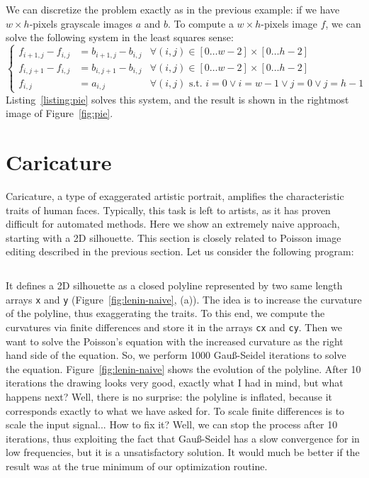 \documentclass[notitlepage,oneside]{book}
\begin{document}
We can discretize the problem exactly as in the previous example: if we have $w \times h$-pixels grayscale images $a$ and $b$.
To compute a $w \times h$-pixels image $f$, we can solve the following system in the least squares sense:
\begin{equation}
\label{eq:pie}
\left \{ \begin{array}{rll}
f_{i+1, j}-f_{i,j} & = b_{i+1, j}-b_{i,j} & \forall (i,j) \in [0 \dots w-2] \times [0\dots h-2]\\
f_{i, j+1}-f_{i,j} & = b_{i, j+1}-b_{i,j} & \forall (i,j) \in [0 \dots w-2] \times [0\dots h-2]\\
f_{i,j}            & = a_{i,j}            & \forall (i,j) \text{~s.t.~} i=0 \vee i=w-1 \vee j=0 \vee j=h-1
\end{array} \right.
\end{equation}
Listing~\ref{listing:pie} solves this system, and the result is shown in the rightmost image of Figure~\ref{fig:pie}.



\section{Caricature}
Caricature, a type of exaggerated artistic portrait, amplifies the characteristic traits of human faces.
Typically, this task is left to artists, as it has proven difficult for automated methods.
Here we show an extremely naive approach, starting with a 2D silhouette.
This section is closely related to Poisson image editing described in the previous section.
Let us consider the following program:
\inputminted[frame=single,linenos=true]{python}{listings/example_6.2_a.py}

It defines a 2D silhouette as a closed polyline represented by two same length arrays \texttt{x} and \texttt{y} (Figure~\ref{fig:lenin-naive}, (a)).
The idea is to increase the curvature of the polyline, thus exaggerating the traits.
To this end, we compute the curvatures via finite differences and store it in the arrays \texttt{cx} and \texttt{cy}.
Then we want to solve the Poisson's equation with the increased curvature as the right hand side of the equation.
So, we perform 1000 Gauß-Seidel iterations to solve the equation. Figure~\ref{fig:lenin-naive} shows the evolution of the polyline.
After 10 iterations the drawing looks very good, exactly what I had in mind, but what happens next?
Well, there is no surprise: the polyline is inflated, because it corresponds exactly to what we have asked for.
To scale finite differences is to scale the input signal... How to fix it?
Well, we can stop the process after 10 iterations, thus exploiting the fact that Gauß-Seidel has a slow convergence for in low frequencies, but it is a unsatisfactory solution.
It would much be better if the result was at the true minimum of our optimization routine.
\end{document}
